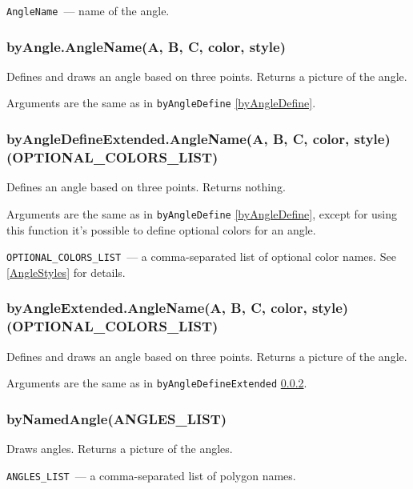 	\texttt{AngleName}~— name of the angle. 


\subsubsection{byAngle.AngleName(A, B, C, color, style)}\label{byAngle}

	Defines and draws an angle based on three points. Returns a picture of the angle.
	
	Arguments are the same as in \texttt{byAngleDefine} \ref{byAngleDefine}.

\subsubsection{byAngleDefineExtended.AngleName(A, B, C, color, style)(OPTIONAL\_COLORS\_LIST)}\label{byAngleDefineExtended}

	Defines an angle based on three points. Returns nothing.
	
	Arguments are the same as in \texttt{byAngleDefine} \ref{byAngleDefine}, except for using this function it's possible to define optional colors for an angle.
	
	\texttt{OPTIONAL\_COLORS\_LIST}~— a comma-separated list of optional color names. See \ref{AngleStyles} for details.
	
\subsubsection{byAngleExtended.AngleName(A, B, C, color, style)(OPTIONAL\_COLORS\_LIST)}\label{byAngleExtended}

	Defines and draws an angle based on three points. Returns a picture of the angle.
	
	Arguments are the same as in \texttt{byAngleDefineExtended} \ref{byAngleDefineExtended}.

\subsubsection{byNamedAngle(ANGLES\_LIST)}\label{byNamedAngle}
	
	Draws angles. Returns a picture of the angles.
	
	\texttt{ANGLES\_LIST}~— a comma-separated list of polygon names.


